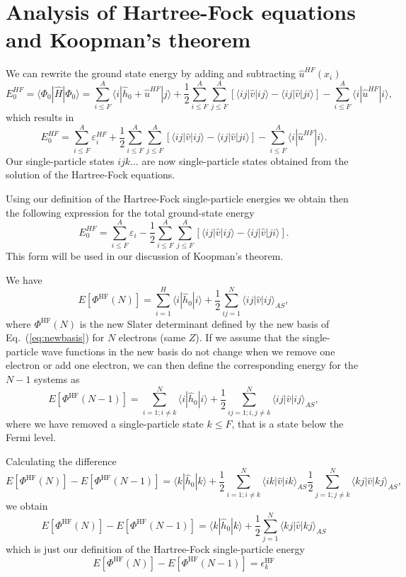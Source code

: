 \documentclass[graybox,sectrefs,envcountresetchap,open=right]{svmonodo}
\begin{document}
\section{Analysis of Hartree-Fock equations and Koopman's theorem}

We can rewrite the ground state energy by adding and subtracting $\hat{u}^{HF}(x_i)$ 
\[
  E_0^{HF} =\langle \Phi_0 | \hat{H} | \Phi_0\rangle = 
\sum_{i\le F}^A \langle i | \hat{h}_0 +\hat{u}^{HF}| j\rangle+ \frac{1}{2}\sum_{i\le F}^A\sum_{j \le F}^A\left[\langle ij |\hat{v}|ij \rangle-\langle ij|\hat{v}|ji\rangle\right]-\sum_{i\le F}^A \langle i |\hat{u}^{HF}| i\rangle,
\]
which results in
\[
  E_0^{HF}
  = \sum_{i\le F}^A \varepsilon_i^{HF} + \frac{1}{2}\sum_{i\le F}^A\sum_{j \le F}^A\left[\langle ij |\hat{v}|ij \rangle-\langle ij|\hat{v}|ji\rangle\right]-\sum_{i\le F}^A \langle i |\hat{u}^{HF}| i\rangle.
\]
Our single-particle states $ijk\dots$ are now single-particle states obtained from the solution of the Hartree-Fock equations.


Using our definition of the Hartree-Fock single-particle energies we obtain then the following expression for the total ground-state energy
\[
  E_0^{HF}
  = \sum_{i\le F}^A \varepsilon_i - \frac{1}{2}\sum_{i\le F}^A\sum_{j \le F}^A\left[\langle ij |\hat{v}|ij \rangle-\langle ij|\hat{v}|ji\rangle\right].
\]
This form will be used in our discussion of Koopman's theorem.


We have 
\[
  E[\Phi^{\mathrm{HF}}(N)] 
  = \sum_{i=1}^H \langle i | \hat{h}_0 | i \rangle +
  \frac{1}{2}\sum_{ij=1}^N\langle ij|\hat{v}|ij\rangle_{AS},
\]
where $\Phi^{\mathrm{HF}}(N)$ is the new Slater determinant defined by the new basis of Eq.~(\ref{eq:newbasis})
for $N$ electrons (same $Z$).  If we assume that the single-particle wave functions in the new basis do not change 
when we remove one electron or add one electron, we can then define the corresponding energy for the $N-1$ systems as 
\[
  E[\Phi^{\mathrm{HF}}(N-1)] 
  = \sum_{i=1; i\ne k}^N \langle i | \hat{h}_0 | i \rangle +
  \frac{1}{2}\sum_{ij=1;i,j\ne k}^N\langle ij|\hat{v}|ij\rangle_{AS},
\]
where we have removed a single-particle state $k\le F$, that is a state below the Fermi level.  


Calculating the difference 
\[
  E[\Phi^{\mathrm{HF}}(N)]-   E[\Phi^{\mathrm{HF}}(N-1)] = \langle k | \hat{h}_0 | k \rangle +
  \frac{1}{2}\sum_{i=1;i\ne k}^N\langle ik|\hat{v}|ik\rangle_{AS}  \frac{1}{2}\sum_{j=1;j\ne k}^N\langle kj|\hat{v}|kj\rangle_{AS},
\]
we obtain
\[
  E[\Phi^{\mathrm{HF}}(N)]-   E[\Phi^{\mathrm{HF}}(N-1)] = \langle k | \hat{h}_0 | k \rangle +
  \frac{1}{2}\sum_{j=1}^N\langle kj|\hat{v}|kj\rangle_{AS}
\]
which is just our definition of the Hartree-Fock single-particle energy
\[
  E[\Phi^{\mathrm{HF}}(N)]-   E[\Phi^{\mathrm{HF}}(N-1)] = \epsilon_k^{\mathrm{HF}} 
\]
\end{document}
